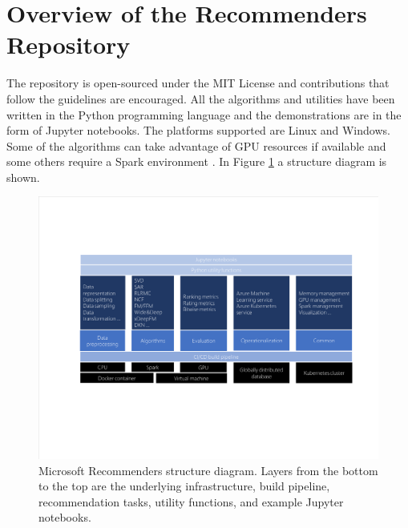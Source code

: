 \section{Overview of the Recommenders Repository}

The repository is open-sourced under the MIT License and contributions that follow the guidelines are encouraged.  
All the algorithms and utilities have been written in the Python programming language and the demonstrations are 
in the form of Jupyter notebooks.
The platforms supported are Linux and Windows. Some of the algorithms can take advantage of GPU resources if available 
and some others require a Spark environment \cite{meng2016mllib}. In Figure \ref{figure_structure} a structure diagram is shown.

\begin{figure}
  \centering
  \includegraphics[width=\textwidth,keepaspectratio]{platform_diagram_crop.pdf}
  \caption{Microsoft Recommenders structure diagram. Layers from the bottom to the top are the underlying 
  infrastructure, build pipeline, recommendation tasks, utility functions, and example Jupyter notebooks.}
  \label{figure_structure}
\end{figure}

%
%
